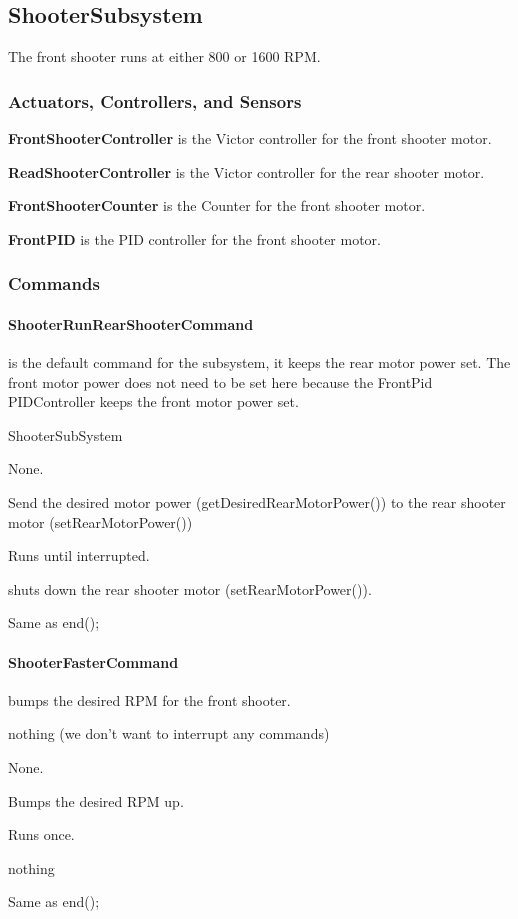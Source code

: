 \documentclass[]{article}
\begin{document}

\subsection{ShooterSubsystem}

The front shooter runs at either 800 or 1600 RPM.

\subsubsection{Actuators, Controllers, and Sensors}

\textbf{FrontShooterController} is the Victor controller for the front shooter motor.

\textbf{ReadShooterController} is the Victor controller for the rear shooter motor.

\textbf{FrontShooterCounter} is the Counter for the front shooter motor.

\textbf{FrontPID} is the PID controller for the front shooter motor.

\subsubsection{Commands}

\paragraph{ShooterRunRearShooterCommand} is the default command for the subsystem, it keeps the rear motor power set. The front motor power does not need to be set here because the FrontPid PIDController keeps the front motor power set.
\begin{description}[topsep=0ex]
\item[requires] ShooterSubSystem
\item[initialization]  None.
\item[execute] Send the desired motor power (getDesiredRearMotorPower()) to the rear shooter motor (setRearMotorPower())
\item[isDone] Runs until interrupted.
\item[end] shuts down the rear shooter motor (setRearMotorPower()).
\item[interrupted] Same as end();
\end{description}

\paragraph{ShooterFasterCommand} bumps the desired RPM for the front shooter.
\begin{description}[topsep=0ex]
\item[requires] nothing (we don't want to interrupt any commands)
\item[initialization]  None.
\item[execute] Bumps the desired RPM up.
\item[isDone] Runs once.
\item[end] nothing
\item[interrupted] Same as end();
\end{description}
\end{document}
